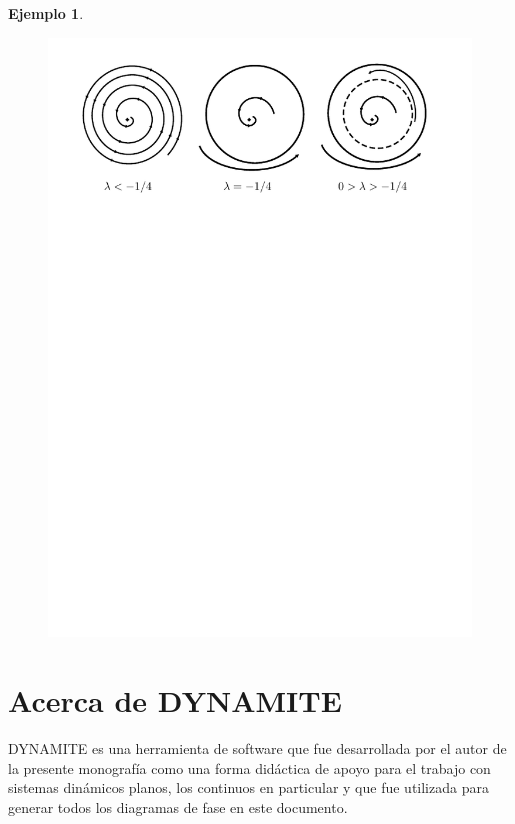 \documentclass[11pt]{book}
\theoremstyle{definition}
\numberwithin{definition}{section}
\theoremstyle{theorem}
\numberwithin{theorem}{section}
\numberwithin{lemma}{section}
\numberwithin{corollary}{section}
\theoremstyle{plain}
\newtheorem{example}{Ejemplo}
\numberwithin{example}{section}
\begin{document}
\begin{example}
\begin{figure}[!ht] \label{fig:bifurcacionsillanododeciclos} \centering
\includegraphics[scale=1.3]{figures/saddlenodecycles.pdf}
\end{figure}

\end{example}

\chapter{Acerca de DYNAMITE} \label{chap:dynamite}

DYNAMITE es una herramienta de software que fue desarrollada por el autor de la presente monografía como una forma didáctica de apoyo para el trabajo con sistemas dinámicos planos, los continuos en particular y que fue utilizada para generar todos los diagramas de fase en este documento.
\end{document}
